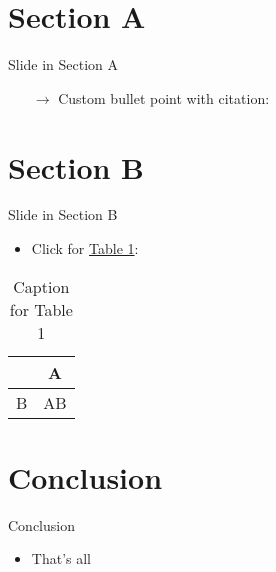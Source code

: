 \documentclass[aspectratio = 1610, english, 11pt, xcolor = dvipsnames]{beamer}
\begin{document}
  \section{Section A}
  \begin{frame}{Slide in Section A}
    \begin{itemize}
      \vspace{2mm}
      \begin{itemize}
        \vspace{2mm}
        \begin{itemize}
        \end{itemize}
      \end{itemize}
      \vspace{3mm}
      \item[$\rightarrow$] Custom bullet point with citation: \alert{\citet{mycitation}}
    \end{itemize}
  \end{frame}

  \section{Section B}
  \begin{frame}{Slide in Section B}
    \begin{itemize}
      \item Click for \alert{\hyperlink{tab:1}{Table 1}}:
    \end{itemize}
    \vspace{1mm}
    \begin{table}
      \centering
      \begin{tabular}{l|c}
        & A\\
        \hline
        B & AB\\
      \end{tabular}
      \caption{Caption for Table 1}
      \label{tab:1}
    \end{table}
  \end{frame}

  \section{Conclusion}
  \begin{frame}{Conclusion}
    \begin{itemize}
      \item That's all
    \end{itemize}
  \end{frame}
\end{document}

